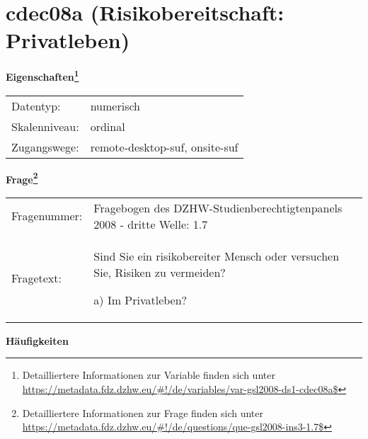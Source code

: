 
    \setcounter{footnote}{0}

    \vspace*{-1.8cm}
	\section{cdec08a (Risikobereitschaft: Privatleben)}
	\label{section:cdec08a}



    \vspace*{0.5cm}
    \noindent\textbf{Eigenschaften\footnote{Detailliertere Informationen zur Variable finden sich unter
		\url{https://metadata.fdz.dzhw.eu/\#!/de/variables/var-gsl2008-ds1-cdec08a$}}}\\
	\begin{tabularx}{\hsize}{@{}lX}
	Datentyp: & numerisch \\
	Skalenniveau: & ordinal \\
	Zugangswege: &
	  remote-desktop-suf, 
	  onsite-suf
 \\
    \end{tabularx}



				\vspace*{0.5cm}
                \noindent\textbf{Frage\footnote{Detailliertere Informationen zur Frage finden sich unter
		              \url{https://metadata.fdz.dzhw.eu/\#!/de/questions/que-gsl2008-ins3-1.7$}}}\\
				\begin{tabularx}{\hsize}{@{}lX}
					Fragenummer: &
					  Fragebogen des DZHW-Studienberechtigtenpanels 2008 - dritte Welle:
					  1.7
 \\
					Fragetext: & Sind Sie ein risikobereiter Mensch oder versuchen Sie, Risiken zu vermeiden?\par  a) Im Privatleben? \\
				\end{tabularx}





        		\vspace*{0.5cm}
                \noindent\textbf{Häufigkeiten}

